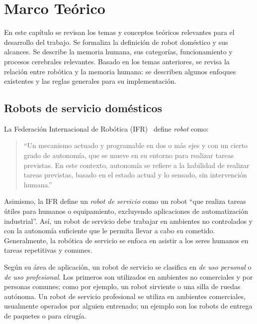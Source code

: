 \chapter{Marco Teórico}\label{chapter:theory}

En este capítulo se revisan los temas y conceptos teóricos relevantes para el desarrollo del trabajo. Se formaliza la definición de robot doméstico y sus alcances. Se describe la memoria humana, sus categorías, funcionamiento y procesos cerebrales relevantes. Basado en los temas anteriores, se revisa la relación entre robótica y la memoria humana: se describen algunos enfoques existentes y las reglas generales para su implementación.

\section{Robots de servicio domésticos}\label{sec:domestic_robots}

La Federación Internacional de Robótica (IFR)~\cite{IFR} define \textit{robot} como:
\begin{quotation}
	``Un mecanismo actuado y programable en dos o más ejes y con un cierto grado de autonomía, que se mueve en su entorno para realizar tareas previstas. En este contexto, autonomía se refiere a la habilidad de realizar tareas previstas, basado en el estado actual y lo sensado, sin intervención humana.''
\end{quotation}

Asimismo, la IFR define un \textit{robot de servicio} como un robot ``que realiza tareas útiles para humanos o equipamiento, excluyendo aplicaciones de automatización industrial''. Así, un robot de servicio debe trabajar en ambientes no controlados y con la autonomía suficiente que le permita llevar a cabo su cometido. Generalmente, la robótica de servicio se enfoca en asistir a los seres humanos en tareas repetitivas y comunes.

Según su área de aplicación, un robot de servicio se clasifica en \textit{de uso personal} o \textit{de uso profesional}. Los primeros son utilizados en ambientes no comerciales y por personas comunes; como por ejemplo, un robot sirviente o una silla de ruedas autónoma. Un robot de servicio profesional se utiliza en ambientes comerciales, usualmente operados por alguien entrenado; un ejemplo son los robots de entrega de paquetes o para cirugía.

